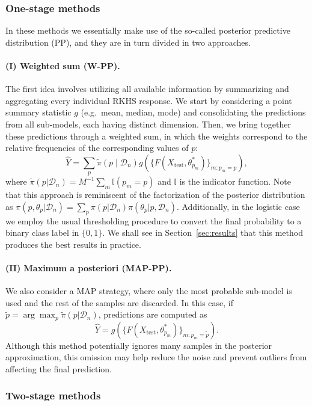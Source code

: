 \documentclass{article}
\numberwithin{equation}{section}
\theoremstyle{plain}
\theoremstyle{definition}
\begin{document}
\subsubsection*{One-stage methods}

In these methods we essentially make use of the so-called posterior predictive distribution (PP), and they are in turn divided in two approaches.

  \paragraph*{(I) Weighted sum (W-PP).} The first idea involves utilizing all available information by summarizing and aggregating every individual RKHS response. We start by considering a point summary statistic \(g\) (e.g.~mean, median, mode) and consolidating the predictions from all sub-models, each having distinct dimension. Then, we bring together these predictions through a weighted sum, in which the weights correspond to the relative frequencies of the corresponding values of \(p\):
  \[
  \hat Y = \sum_{p} \tilde\pi(p\mid\mathcal D_n) g(\{F(X_{\text{test}}, \theta^*_{p_m})\}_{m:p_m=p}),
  \]
  where \(\tilde \pi(p|\mathcal D_n) = M^{-1}\sum_m \mathbb I(p_m=p)\) and \(\mathbb I\) is the indicator function. Note that this approach is reminiscent of the factorization of the posterior distribution as \(\pi(p, \theta_p|\mathcal D_n) = \sum_{p}\pi(p|\mathcal D_n)\pi(\theta_p|p, \mathcal D_n)\). Additionally, in the logistic case we employ the usual thresholding procedure to convert the final probability to a binary class label in \(\{0,1\}\). We shall see in Section~\ref{sec:results} that this method produces the best results in practice.

  \paragraph*{(II) Maximum a posteriori (MAP-PP).} We also consider a MAP strategy, where only the most probable sub-model is used and the rest of the samples are discarded. In this case, if \(\tilde p = \arg\max_p \tilde  \pi(p|\mathcal D_n)\), predictions are computed as
  \[
  \hat Y = g(\{F(X_{\text{test}}, \theta^*_{p_m})\}_{m:p_m=\tilde p}).
  \]
  Although this method potentially ignores many samples in the posterior approximation, this omission may help reduce the noise and prevent outliers from affecting the final prediction.

\subsubsection*{Two-stage methods}
\end{document}
